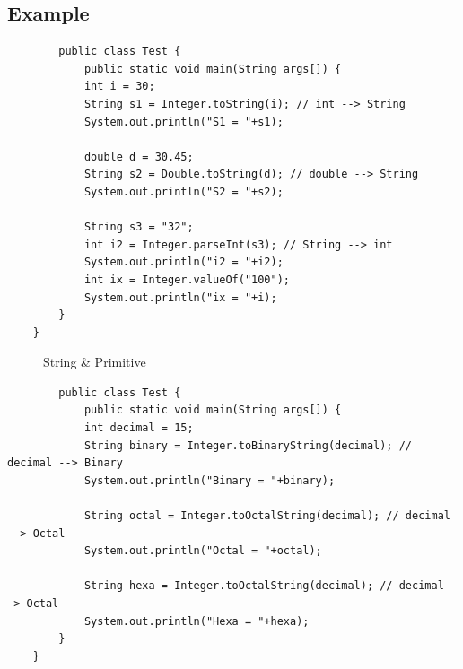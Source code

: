 \documentclass[openany]{book}  %
\begin{document}
\subsection{Example}
\begin{center}
    \begin{verbatim}
        public class Test {
            public static void main(String args[]) {
            int i = 30;
            String s1 = Integer.toString(i); // int --> String
            System.out.println("S1 = "+s1);

            double d = 30.45;
            String s2 = Double.toString(d); // double --> String
            System.out.println("S2 = "+s2);
            
            String s3 = "32";
            int i2 = Integer.parseInt(s3); // String --> int
            System.out.println("i2 = "+i2);
            int ix = Integer.valueOf("100");
            System.out.println("ix = "+i);
        }
    }
    \end{verbatim}
\end{center}
% 
% 
\begin{figure}[htbp]
    \begin{center}
        \caption{String \& Primitive}
    \end{center}
\end{figure}
\begin{center}
    \begin{verbatim}
        public class Test {
            public static void main(String args[]) {
            int decimal = 15;
            String binary = Integer.toBinaryString(decimal); // decimal --> Binary
            System.out.println("Binary = "+binary);

            String octal = Integer.toOctalString(decimal); // decimal --> Octal
            System.out.println("Octal = "+octal);

            String hexa = Integer.toOctalString(decimal); // decimal --> Octal
            System.out.println("Hexa = "+hexa);
        }
    }
    \end{verbatim}
\end{center}
% 
\end{document}
